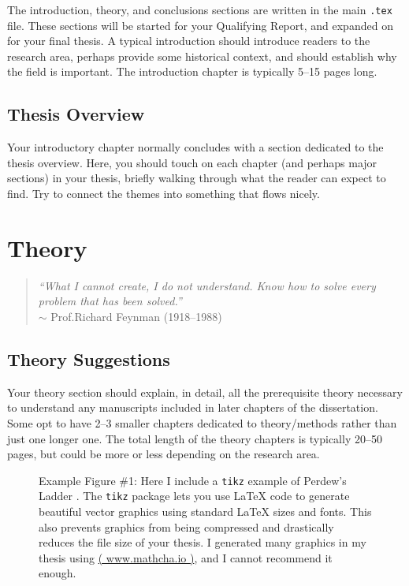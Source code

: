\documentclass[12pt,letterpaper,oneside,titlepage,final]{dalthesis}
\numberwithin{equation}{section}
\begin{document}
The introduction, theory, and conclusions sections are written in the main \texttt{.tex} file. These sections will be started for your Qualifying Report, and expanded on for your final thesis. A typical introduction should introduce readers to the research area, perhaps provide some historical context, and should establish why the field is important. The introduction chapter is typically 5--15 pages long.

\section{Thesis Overview} \label{C1:Overview}

Your introductory chapter normally concludes with a section dedicated to the thesis overview. Here, you should touch on each chapter (and perhaps major sections) in your thesis, briefly walking through what the reader can expect to find. Try to connect the themes into something that flows nicely.


\chapter{Theory} \label{Theory} \thispagestyle{Chapter}
\begin{quote}
\textsl{``What I cannot create, I do not understand. Know how to solve every problem that has been solved.''} \cite{feynman1988blackboard} \\ 
$\sim$ Prof.\@ Richard Feynman (1918--1988)
\end{quote}
\vspace*{0.5cm}

\section{Theory Suggestions} \label{C2:Suggestions}

Your theory section should explain, in detail, all the prerequisite theory necessary to understand any manuscripts included in later chapters of the dissertation. Some opt to have 2--3 smaller chapters dedicated to theory/methods rather than just one longer one. The total length of the theory chapters is typically 20--50 pages, but could be more or less depending on the research area. 


\begin{figure}[h!] %

\caption[Example Figure \#1: \texttt{tikz} example of Perdew's Ladder.]{Example Figure \#1: Here I include a \texttt{tikz} example of Perdew's Ladder \cite{perdew2001jacob}. The \texttt{tikz} package lets you use LaTeX code to generate beautiful vector graphics using standard LaTeX sizes and fonts. This also prevents graphics from being compressed and drastically reduces the file size of your thesis. I generated many graphics in my thesis using \href{https://www.mathcha.io}{( www.mathcha.io )}, and I cannot recommend it enough. \label{F2.1}}
\end{figure}
\end{document}
